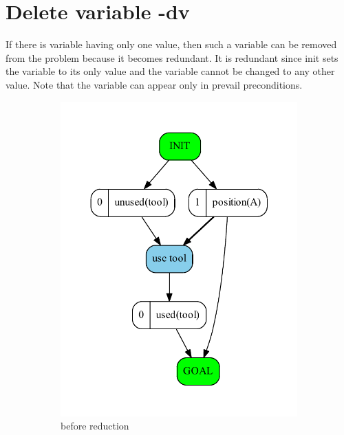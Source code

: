 
	\chapter{Delete variable -dv}
	
	If there is variable having only one value, then such a variable can be removed from the problem because it becomes redundant. It is redundant since init sets the variable to its only value and the variable cannot be changed to any other value. Note that the variable can appear only in prevail preconditions. 
	
	\begin{figure}
		\begin{subfigure}[b]{0.4\textwidth}
			\includegraphics[scale=0.4]{deleteVariable/figures/simple_input}
			\caption{before reduction}
		\end{subfigure}	
		\begin{subfigure}[b]{0.4\textwidth}

\end{subfigure}
\end{figure}
